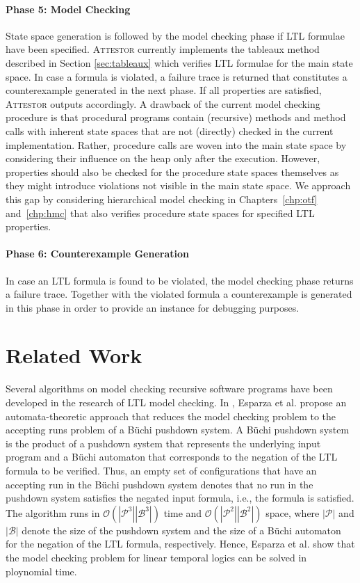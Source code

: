 \documentclass[a4paper, 12pt, twoside]{report}
\begin{document}
	
	\paragraph{Phase 5: Model Checking}
	State space generation is followed by the model checking phase if LTL formulae have been specified. \textsc{Attestor} currently implements the tableaux method described in Section \ref{sec:tableaux} which verifies LTL formulae for the main state space. In case a formula is violated, a failure trace is returned that constitutes a counterexample generated in the next phase. If all properties are satisfied, \textsc{Attestor} outputs accordingly. A drawback of the current model checking procedure is that procedural programs contain (recursive) methods and method calls with inherent state spaces that are not (directly) checked in the current implementation. Rather, procedure calls are woven into the main state space by considering their influence on the heap only after the execution. However, properties should also be checked for the procedure state spaces themselves as they might introduce violations not visible in the main state space. We approach this gap by considering hierarchical model checking in Chapters~\ref{chp:otf} and~\ref{chp:hmc} that also verifies procedure state spaces for specified LTL properties.
	
	\paragraph{Phase 6: Counterexample Generation}
	In case an LTL formula is found to be violated, the model checking phase returns a failure trace. Together with the violated formula a counterexample is generated in this phase in order to provide an instance for debugging purposes.

	\section{Related Work}
	Several algorithms on model checking recursive software programs have been developed in the research of LTL model checking. In \cite{esparza2000}, Esparza et al. propose an automata-theoretic approach that reduces the model checking problem to the accepting runs problem of a Büchi pushdown system. A Büchi pushdown system is the product of a pushdown system that represents the underlying input program and a Büchi automaton that corresponds to the negation of the LTL formula to be verified. Thus, an empty set of configurations that have an accepting run in the Büchi pushdown system denotes that no run in the pushdown system satisfies the negated input formula, i.e., the formula is satisfied. The algorithm runs in $\mathcal{O}(|\mathcal{P}^3||\mathcal{B}^3|)$ time and $\mathcal{O}(|\mathcal{P}^2||\mathcal{B}^2|)$ space, where $|\mathcal{P}|$ and $|\mathcal{B}|$ denote the size of the pushdown system and the size of a Büchi automaton for the negation of the LTL formula, respectively. Hence, Esparza et al. show that the model checking problem for linear temporal logics can be solved in ploynomial time.\\
	
\end{document}

